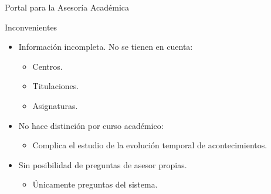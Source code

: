 \documentclass[10pt, hyperref={pdfpagelabels=false}]{beamer}
\begin{document}
      \begin{frame}{Portal para la Asesoría Académica}
        \begin{block}{Inconvenientes}
          \begin{itemize}
           \item Información incompleta. No se tienen en cuenta:
           \begin{itemize}
            \item Centros.
            \item Titulaciones.
            \item Asignaturas.
           \end{itemize}
           \item No hace distinción por curso académico:
           \begin{itemize}
            \item Complica el estudio de la evolución temporal de
                  acontecimientos.
           \end{itemize}
           \item Sin posibilidad de preguntas de asesor propias.
           \begin{itemize}
            \item Únicamente preguntas del sistema.
           \end{itemize}
          \end{itemize}
        \end{block}
      \end{frame}
\end{document}
